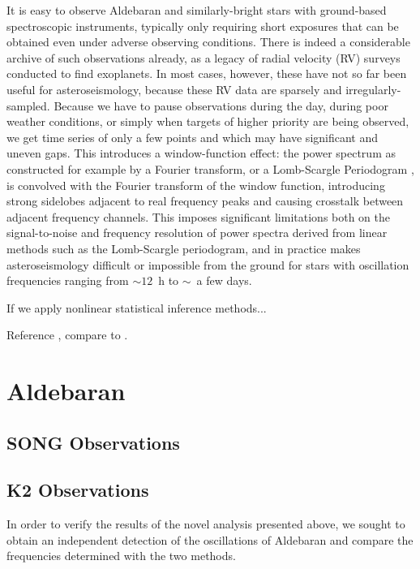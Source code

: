 \documentclass[modern]{aastex61}
\begin{document}
It is easy to observe Aldebaran and similarly-bright stars with ground-based spectroscopic instruments, typically only requiring short exposures that can be obtained even under adverse observing conditions. There is indeed a considerable archive of such observations already, as a legacy of radial velocity (RV) surveys conducted to find exoplanets. In most cases, however, these have not so far been useful for asteroseismology, because these RV data are sparsely and irregularly-sampled. Because we have to pause observations during the day, during poor weather conditions, or simply when targets of higher priority are being observed, we get time series of only a few points and which may have significant and uneven gaps. This introduces a window-function effect: the power spectrum as constructed for example by a Fourier transform, or a Lomb-Scargle Periodogram \citep{lomb,scargle}, is convolved with the Fourier transform of the window function, introducing strong sidelobes adjacent to real frequency peaks and causing crosstalk between adjacent frequency channels. This imposes significant limitations both on the signal-to-noise and frequency resolution of power spectra derived from linear methods such as the Lomb-Scargle periodogram, and in practice makes asteroseismology difficult or impossible from the ground for stars with oscillation frequencies ranging from $\sim 12$~h to $\sim$~a few days. 

If we apply nonlinear statistical inference methods...

Reference \citet{Kelly2014}, compare to \citet{Foreman-Mackey2017}.

\section{Aldebaran}



\subsection{SONG Observations}

\subsection{K2 Observations}

In order to verify the results of the novel analysis presented above, we sought to obtain an independent detection of the oscillations of Aldebaran and compare the frequencies determined with the two methods. 
\end{document}

